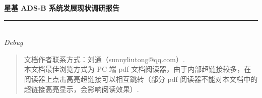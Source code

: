 
\thispagestyle{empty}

\noindent\begin{minipage}{\textwidth}
\raggedleft
{\huge \bfseries 星基 ADS-B 系统发展现状调研报告}
\noindent\rule[-1ex]{\textwidth}{5pt}\\[2.5ex]
\hfill\emph{\Large Debug}
\end{minipage}

\noindent{}


\begin{quote}\footnotesize
  文档作者联系方式：刘通（sunnyliutong@qq.com）. \\
  本文档最佳浏览方式为 PC 端 pdf 文档阅读器，由于内部超链接较多，在阅读器上点击高亮超链接可以相互跳转（部分 pdf 阅读器不能对本文档中的超链接高亮显示，会影响阅读效果）.
\end{quote}